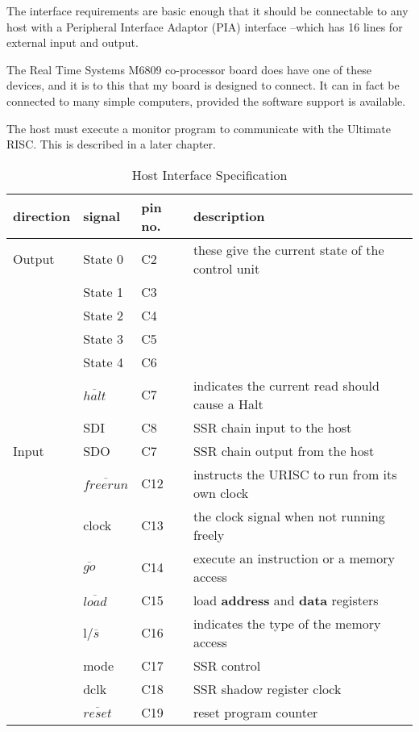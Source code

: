 The interface requirements are basic enough that it should be 
connectable to any host with a Peripheral Interface Adaptor (PIA) interface --which has 16  lines for external input and output.

The Real Time Systems M6809 co-processor board does have one of these devices, and
it is to this that my board is designed to connect. It can in fact be connected to many simple computers, provided the software support is available.

The host must execute a monitor program to communicate with the Ultimate RISC. This is described in a later chapter.

\begin{table}
\label{table:hostif}
\begin{tabular}{||l|lll||}
\hline
direction & signal & pin no. & description \\
\hline 
Output
 & State 0 & C2 & these give the current state of the control unit\\
 & State 1 & C3 & \\
 & State 2 & C4 & \\
 & State 3 & C5 & \\
 & State 4 & C6 & \\
 & $\overline{halt}$	& C7 & indicates the current read should cause a Halt\\
 & SDI	& C8 & SSR chain input to the host\\
\hline
Input 
 & SDO & C7 & SSR chain output from the host\\
 & $\overline{freerun}$ & C12 & instructs the URISC to run from its own clock\\
 & clock & C13 & the clock signal when not running freely\\
 & $\overline{go}$ & C14 & execute an instruction or a memory access\\
 & $\overline{load}$ & C15 & load {\bf address} and {\bf data} registers\\
 & l/$\overline{s}$ & C16 & indicates the type of the memory access\\
 & mode & C17 & SSR control\\
 & dclk & C18 & SSR shadow register clock\\
 & $\overline{reset}$ & C19 & reset program counter\\
 \hline
 \end{tabular}
 \caption{Host Interface Specification}

 \end{table}
 
 

